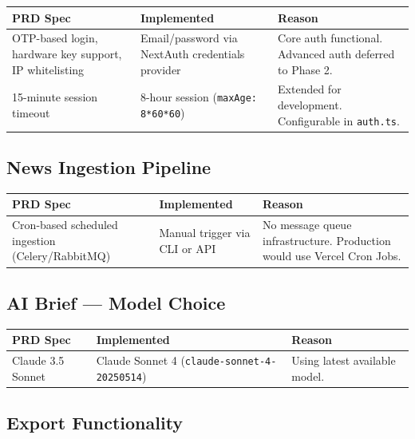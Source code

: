 \documentclass[12pt,a4paper]{article}
\begin{document}
\begin{center}
\begin{tabular}{p{4cm}p{4cm}p{5cm}}
\toprule
\textbf{PRD Spec} & \textbf{Implemented} & \textbf{Reason} \\
\midrule
OTP-based login, hardware key support, IP whitelisting & Email/password via NextAuth credentials provider & Core auth functional. Advanced auth deferred to Phase 2. \\
15-minute session timeout & 8-hour session (\texttt{maxAge: 8*60*60}) & Extended for development. Configurable in \texttt{auth.ts}. \\
\bottomrule
\end{tabular}
\end{center}

\subsection{News Ingestion Pipeline}

\begin{center}
\begin{tabular}{p{4cm}p{4cm}p{5cm}}
\toprule
\textbf{PRD Spec} & \textbf{Implemented} & \textbf{Reason} \\
\midrule
Cron-based scheduled ingestion (Celery/RabbitMQ) & Manual trigger via CLI or API & No message queue infrastructure. Production would use Vercel Cron Jobs. \\
\bottomrule
\end{tabular}
\end{center}

\subsection{AI Brief — Model Choice}

\begin{center}
\begin{tabular}{p{4cm}p{4cm}p{5cm}}
\toprule
\textbf{PRD Spec} & \textbf{Implemented} & \textbf{Reason} \\
\midrule
Claude 3.5 Sonnet & Claude Sonnet 4 (\texttt{claude-sonnet-4-20250514}) & Using latest available model. \\
\bottomrule
\end{tabular}
\end{center}

\subsection{Export Functionality}
\end{document}
